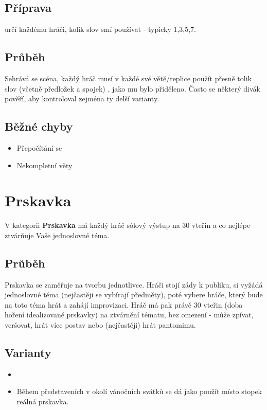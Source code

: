\subsection{Příprava}  určí každému hráči, kolik slov smí používat - typicky 1,3,5,7.  
 
\subsection{Průběh} Sehrává se scéna, každý hráč musí v každé své větě/replice použít přesně tolik slov (včetně předložek a spojek) , jako mu bylo přiděleno. 
Často se některý divák pověří, aby kontroloval zejména ty delší varianty. 
 
 
\subsection{ Běžné chyby } \begin{itemize}
\item  Přepočítání se
\item  Nekompletní věty
\end{itemize}
 
 
 
\needspace{5cm} \section{Prskavka} \label{prskavka}  
V kategorii \textbf{Prskavka}{} má každý hráč sólový výstup na 30 vteřin a co nejlépe ztvárňuje Vaše jednoslovné téma. 
 
\subsection{Průběh} Prskavka se zaměřuje na tvorbu jednotlivce. 
Hráči stojí zády k publiku,  si vyžádá jednoslovné téma (nejčastěji se vybírají předměty), poté vybere hráče, který bude na toto téma hrát a zahájí improvizaci. Hráč má pak právě 30 vteřin (doba hoření idealizované prskavky) na ztvárnění tématu, bez omezení - může zpívat, veršovat, hrát více postav nebo (nejčastěji) hrát pantomimu. 
 
\subsection{ Varianty } \begin{itemize}
\item {}
\item Během představeních v okolí vánočních svátků se dá jako  použít místo stopek reálná prskavka.
\end{itemize}
 
